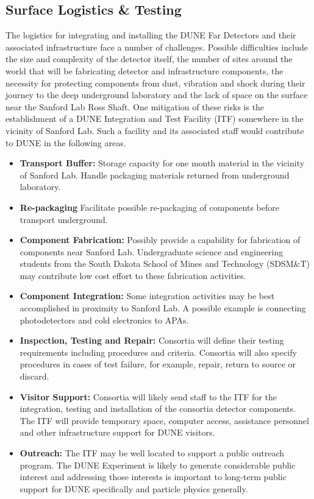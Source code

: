 \subsection{Surface Logistics \& Testing}
\label{sec:fdsp-coord-integ-test}

The logistics for integrating and installing the DUNE Far Detectors
and their associated infrastructure face a number of
challenges. Possible difficulties include the size and complexity of
the detector itself, the number of sites around the world that will be
fabricating detector and infrastructure components, the necessity for
protecting components from dust, vibration and shock during their
journey to the deep underground laboratory and the lack of space on
the surface near the Sanford Lab Ross Shaft. One mitigation
of these risks is the establishment of a DUNE
Integration and Test Facility (ITF) somewhere in the vicinity of
Sanford Lab. Such a facility and its associated staff would contribute
to DUNE in the following areas.
\begin{itemize}
  \item {\bf Transport Buffer:} Storage capacity for one month
    material in the vicinity of Sanford Lab. Handle packaging
    materials returned from underground laboratory.
  \item {\bf Re-packaging} Facilitate possible re-packaging of
    components before transport underground.
  \item {\bf Component Fabrication:} Possibly provide a capability for
    fabrication of components near Sanford Lab. Undergraduate science
    and engineering students from the South Dakota School of Mines and
    Technology (SDSM\&T) may contribute low cost effort to these
    fabrication activities.
  \item {\bf Component Integration:} Some integration activities may
    be best accomplished in proximity to Sanford Lab. A possible
    example is connecting photodetectors and cold electronics to APAs.
  \item {\bf Inspection, Testing and Repair:} Consortia will define
    their testing requirements including procedures and
    criteria. Consortia will also specify procedures in cases of test
    failure, for example, repair, return to source or discard.
  \item {\bf Visitor Support:} Consortia will likely send staff to the
    ITF for the integration, testing and installation of the consortia
    detector components. The ITF will provide temporary space,
    computer access, assistance personnel and other infrastructure
    support for DUNE visitors.
\item {\bf Outreach:} The ITF may be well located to support a public outreach program. The DUNE Experiment is likely to generate considerable public interest and addressing those interests is important to long-term public support for DUNE specifically and particle physics generally.
\end{itemize}

